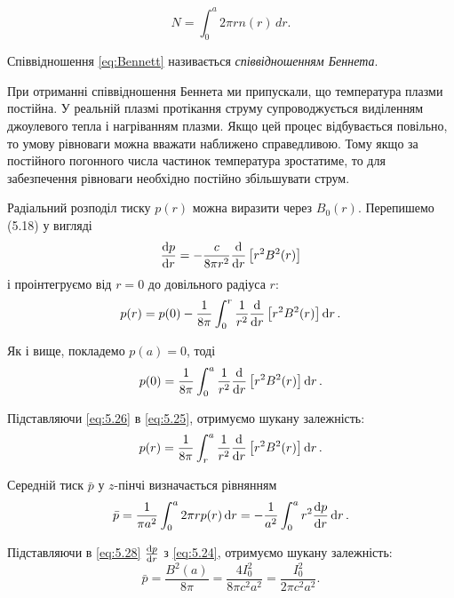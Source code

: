 \documentclass{article}
\begin{document}
\begin{equation}
    N = \int_{0}^{a} 2\pi r n(r) \, dr.
\end{equation}

Співвідношення \eqref{eq:Bennett} називається \emph{співвідношенням Беннета}.

\begin{small}
При отриманні співвідношення Беннета ми припускали, що
температура плазми постійна. У реальній плазмі протікання струму
супроводжується виділенням джоулевого тепла і нагріванням плазми. Якщо цей
процес відбувається повільно, то умову рівноваги можна вважати
наближено справедливою. Тому якщо за постійного погонного числа частинок
температура зростатиме, то для забезпечення рівноваги необхідно
постійно збільшувати струм.
\end{small}



Радіальний розподіл тиску \( p(r) \) можна виразити через \( B_0(r) \). Перепишемо (5.18) у вигляді
\begin{equation}\label{eq:5.24}
    \dv{p}{r} = -\frac{c}{8\pi r^2} \dv{r} \left[ r^2 B^2(r) \right]
\end{equation}
і проінтегруємо від \( r = 0 \) до довільного радіуса \( r \):
\begin{equation}\label{eq:5.25}
    p(r) = p(0) - \frac{1}{8\pi} \int_{0}^{r} \frac{1}{r^2} \dv{r} \left[ r^2 B^2(r) \right] \dd{r}.
\end{equation}

Як і вище, покладемо \( p(a) = 0 \), тоді
\begin{equation}\label{eq:5.26}
    p(0) = \frac{1}{8\pi} \int_{0}^{a} \frac{1}{r^2} \dv{r} \left[ r^2 B^2(r) \right] \dd{r}.
\end{equation}

Підставляючи \eqref{eq:5.26} в \eqref{eq:5.25}, отримуємо шукану залежність:
\begin{equation}\label{eq:5.27}
    p(r) = \frac{1}{8\pi} \int_{r}^{a} \frac{1}{r^2} \dv{r} \left[ r^2 B^2(r) \right] \dd{r}.
\end{equation}

Середній тиск \( \bar{p} \) у $z$-пінчі визначається рівнянням
\begin{equation}\label{eq:5.28}
    \bar{p} = \frac{1}{\pi a^2} \int_{0}^{a} 2\pi r p(r) \dd{r} = -\frac{1}{a^2} \int_{0}^{a} r^2
    \dv{p}{r} \dd{r}.
\end{equation}




Підставляючи в \eqref{eq:5.28} \( \dv{p}{r} \) з \eqref{eq:5.24}, отримуємо шукану залежність:
\begin{equation}\label{eq:5.29}
    \bar{p} = \frac{B^2(a)}{8\pi} = \frac{4I_0^2}{8\pi c^2 a^2} = \frac{I_0^2}{2\pi c^2 a^2}.
\end{equation}
\end{document}
